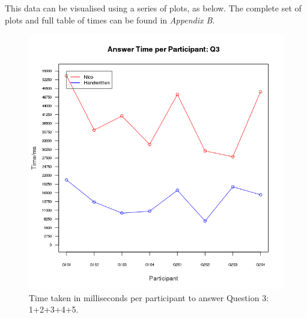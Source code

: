 \documentclass[12pt,twoside,notitlepage,xetex]{report}
\begin{document}
{This data can be visualised using a series of plots, as below.  The complete set of plots and full table of times can be found in \emph{Appendix B}.

\begin{center}
\begin{figure}[H]
\begin{center}
\includegraphics[width=\textwidth-2cm]{figs/graphs/q3.png}
\end{center}
\caption{Time taken in milliseconds per participant to answer Question 3: 1+2+3+4+5.}
\label{fig:PlotQ3}
\end{figure}
\end{center}

}
\end{document}
